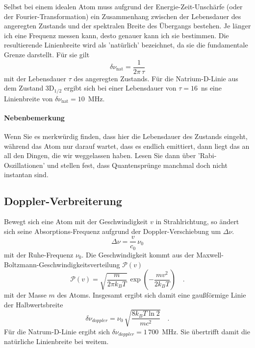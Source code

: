 Selbst bei einem idealen Atom muss aufgrund der Energie-Zeit-Unschärfe (oder der Fourier-Transformation) ein Zusammenhang zwischen der Lebensdauer des angeregten Zustands und der spektralen Breite des Übergangs bestehen. Je länger ich eine Frequenz messen kann, desto genauer kann ich sie bestimmen. Die resultierende Linienbreite wird als 'natürlich' bezeichnet, da sie die fundamentale Grenze darstellt. Für sie gilt
\begin{equation}
    \delta \nu_\text{nat} = \frac{1}{2\pi \, \tau}
\end{equation}
mit der Lebensdauer $\tau$ des angeregten Zustands. Für die Natrium-D-Linie aus dem Zustand 3D$_{1/2}$ ergibt sich bei einer Lebensdauer von $\tau = 16$~ns eine Linienbreite von $\delta \nu_\text{nat} = 10$~MHz.

\paragraph{Nebenbemerkung} Wenn Sie es merkwürdig finden, dass hier die Lebensdauer des Zustands eingeht, während das Atom nur darauf wartet, dass es endlich emittiert, dann liegt das an all den Dingen, die wir weggelassen haben. Lesen Sie dann über  'Rabi-Oszillationen' und stellen fest, dass Quantensprünge manchmal doch nicht instantan sind.


\subsection{Doppler-Verbreiterung}


Bewegt sich eine Atom mit der Geschwindigkeit  $v$ in Strahlrichtung, so ändert sich seine Absorptions-Frequenz aufgrund der Doppler-Verschiebung um $\Delta \nu$.
\begin{equation}
	\Delta \nu = \frac{v}{c_0} \, \nu_0
\end{equation}
mit der Ruhe-Frequenz $\nu_0$. Die Geschwindigkeit kommt  aus der  Maxwell-Boltzmann-Geschwindigkeitsverteilung $\mathcal{P}(v)$
\begin{equation}
	\mathcal{P}(v) = \sqrt{\frac{m}{2 \pi k_B T}} \, \exp \left (
	- \frac{m v^2}{2  k_B T}	
	\right) \quad .
\end{equation}
mit der Masse $m$ des Atoms.
Insgesamt ergibt sich damit eine gaußförmige  Linie der Halbwertsbreite 
\begin{equation}
	 \delta \nu_{doppler} = \nu_0 \, \sqrt{\frac{8 k_B T \ln 2} {m c^2}} \quad .
\end{equation}
Für die Natrum-D-Linie ergibt sich  $\delta \nu_{doppler} = 1 \, 700$~MHz. Sie übertrifft damit die natürliche Linienbreite bei weitem.

